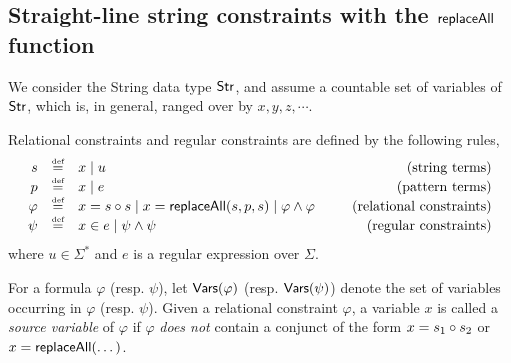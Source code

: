

\subsection{Straight-line string constraints with the $\mathsf{replaceAll}$ function}


We consider the String data type ${\sf Str}$, and assume a countable set of variables of ${\sf Str}$, which is, in general, ranged over by $x, y, z, \cdots$.  



\begin{definition}
	Relational constraints and regular constraints are defined by the following rules,
	\[
	\begin{array}{r c l cr}
	s &\eqdef & x \mid u & \ \ & \mbox{(string terms)}\\
	p &\eqdef & x \mid e & \ \ & \mbox{(pattern terms)}\\
	\varphi &\eqdef & x = s \concat s  \mid  x = \replaceall(s, p, s) \mid \varphi \wedge \varphi & \ \ & \mbox{(relational constraints)}\\
	\psi & \eqdef & x \in e \mid \psi \wedge \psi %
	& \ \ & \mbox{(regular constraints)} \\
	\end{array}
	\]
	where $u \in \Sigma^\ast$ and $e$ is a regular expression over $\Sigma$. 
	
%	
\end{definition}


For a formula $\varphi$ (resp. $\psi$), let $\mathsf{Vars}(\varphi)$ (resp. $\mathsf{Vars}(\psi)$) denote the set of variables occurring in $\varphi$ (resp. $\psi$). Given a relational constraint $\varphi$, a variable $x$ is called a \emph{source variable} of $\varphi$ if $\varphi$ \emph{does not} contain a conjunct of the form $x = s_1 \circ s_2$ or $x = \mathsf{replaceAll}(\dots)$.

